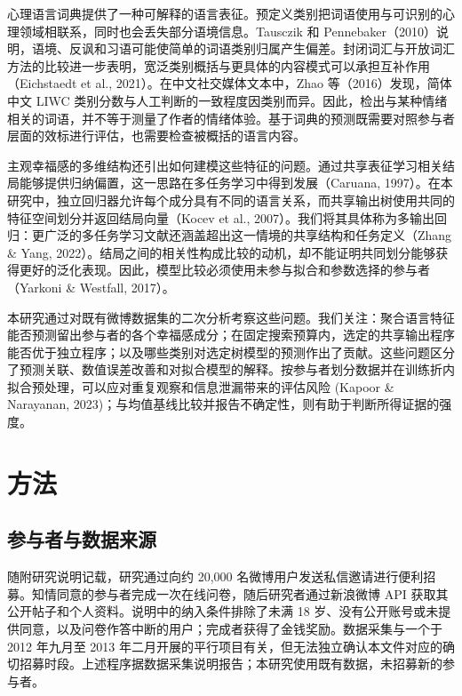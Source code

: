 \documentclass[11pt,letterpaper]{article}
\begin{document}
心理语言词典提供了一种可解释的语言表征。预定义类别把词语使用与可识别的心理领域相联系，同时也会丢失部分语境信息。Tausczik 和 Pennebaker（2010）说明，语境、反讽和习语可能使简单的词语类别归属产生偏差。封闭词汇与开放词汇方法的比较进一步表明，宽泛类别概括与更具体的内容模式可以承担互补作用（Eichstaedt et al., 2021）。在中文社交媒体文本中，Zhao 等（2016）发现，简体中文 LIWC 类别分数与人工判断的一致程度因类别而异。因此，检出与某种情绪相关的词语，并不等于测量了作者的情绪体验。基于词典的预测既需要对照参与者层面的效标进行评估，也需要检查被概括的语言内容。

主观幸福感的多维结构还引出如何建模这些特征的问题。通过共享表征学习相关结局能够提供归纳偏置，这一思路在多任务学习中得到发展（Caruana, 1997）。在本研究中，独立回归器允许每个成分具有不同的语言关系，而共享输出树使用共同的特征空间划分并返回结局向量（Kocev et al., 2007）。我们将其具体称为多输出回归：更广泛的多任务学习文献还涵盖超出这一情境的共享结构和任务定义（Zhang \& Yang, 2022）。结局之间的相关性构成比较的动机，却不能证明共同划分能够获得更好的泛化表现。因此，模型比较必须使用未参与拟合和参数选择的参与者（Yarkoni \& Westfall, 2017）。

本研究通过对既有微博数据集的二次分析考察这些问题。我们关注：聚合语言特征能否预测留出参与者的各个幸福感成分；在固定搜索预算内，选定的共享输出程序能否优于独立程序；以及哪些类别对选定树模型的预测作出了贡献。这些问题区分了预测关联、数值误差改善和对拟合模型的解释。按参与者划分数据并在训练折内拟合预处理，可以应对重复观察和信息泄漏带来的评估风险 (Kapoor \& Narayanan, 2023)；与均值基线比较并报告不确定性，则有助于判断所得证据的强度。

\section{方法}\label{ux65b9ux6cd5}

\subsection{参与者与数据来源}\label{ux53c2ux4e0eux8005ux4e0eux6570ux636eux6765ux6e90}

随附研究说明记载，研究通过向约 20,000 名微博用户发送私信邀请进行便利招募。知情同意的参与者完成一次在线问卷，随后研究者通过新浪微博 API 获取其公开帖子和个人资料。说明中的纳入条件排除了未满 18 岁、没有公开账号或未提供同意，以及问卷作答中断的用户；完成者获得了金钱奖励。数据采集与一个于 2012 年九月至 2013 年二月开展的平行项目有关，但无法独立确认本文件对应的确切招募时段。上述程序据数据采集说明报告；本研究使用既有数据，未招募新的参与者。
\end{document}
